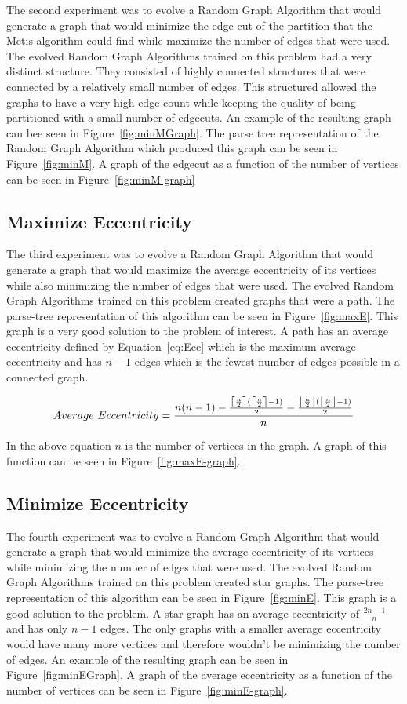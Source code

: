 \documentclass{article}
\DeclarePairedDelimiter\ceil{\lceil}{\rceil}
\DeclarePairedDelimiter\floor{\lfloor}{\rfloor}
\begin{document}
The second experiment was to evolve a Random Graph Algorithm that would generate a graph that would minimize the edge cut of the partition
that the Metis algorithm could find while maximize the number of edges that were used. The evolved Random Graph Algorithms trained on
this problem had a very distinct structure. They consisted of highly connected structures that were connected by a relatively small number
of edges. This structured allowed the graphs to have a very high edge count while keeping the quality of being partitioned with a small
number of edgecuts. An example of the resulting graph can bee seen in Figure~\ref{fig:minMGraph}. The parse tree representation of the
Random Graph Algorithm which produced this graph can be seen in Figure~\ref{fig:minM}. A graph of the edgecut as a function of the number
of vertices can be seen in Figure~\ref{fig:minM-graph}

\subsection{Maximize Eccentricity}
The third experiment was to evolve a Random Graph Algorithm that would generate a graph that would maximize the average eccentricity of its
vertices while also minimizing the number of edges that were used. The evolved Random Graph Algorithms trained on this problem created
graphs that were a path. The parse-tree representation of this algorithm can be seen in Figure~\ref{fig:maxE}. 
This graph is a very good solution to the problem of interest. A path has an average eccentricity defined by Equation~\ref{eq:Ecc} 
which is the maximum average eccentricity and has $n-1$ edges which is the fewest number of edges possible 
in a connected graph.

\begin{equation}
\label{eq:Ecc}
Average~Eccentricity = \frac{n(n-1) - \frac{\ceil*{\frac{n}{2}}(\ceil*{\frac{n}{2}}-1)}{2} - \frac{\floor*{\frac{n}{2}}(\floor*{\frac{n}{2}}-1)}{2}}{n}
\end{equation}

In the above equation $n$ is the number of vertices in the graph. A graph of this function can be seen in Figure~\ref{fig:maxE-graph}.

\subsection{Minimize Eccentricity}
The fourth experiment was to evolve a Random Graph Algorithm that would generate a graph that would minimize the average eccentricity of
its vertices while minimizing the number of edges that were used. The evolved Random Graph Algorithms trained on this problem created star
graphs. The parse-tree representation of this algorithm can be seen in Figure~\ref{fig:minE}. This graph is a good solution to the problem.
A star graph has an average eccentricity of $\frac{2n-1}{n}$ and has only $n-1$ edges. The only graphs with a smaller average eccentricity
would have many more vertices and therefore wouldn't be minimizing the number of edges. An example of the resulting graph can be seen in Figure~\ref{fig:minEGraph}.
A graph of the average eccentricity as a function of the number of vertices can be seen in Figure~\ref{fig:minE-graph}. 
\end{document}
